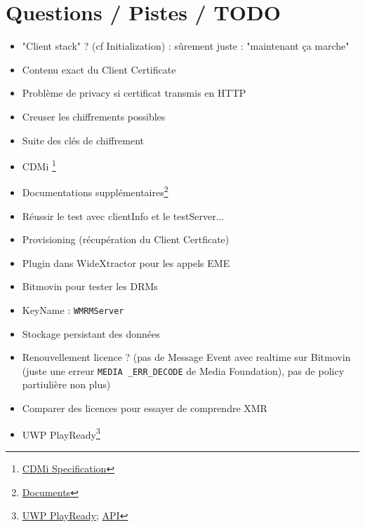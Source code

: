 \documentclass[french]{article}
\begin{document}
\section{Questions / Pistes / TODO}
\begin{itemize}
	\item[\checkmark] "Client stack" ? (cf Initialization) : sûrement juste : "maintenant ça marche"
	\item[\checkmark] Contenu exact du Client Certificate
	\item Problème de privacy si certificat transmis en HTTP
	\item[\checkmark] Creuser les chiffrements possibles
	\item Suite des clés de chiffrement
	\item CDMi \footnote{\href{https://download.microsoft.com/download/E/A/4/EA470677-6C3C-4AFE-8A86-A196ADFD0F78/Content Decryption Module Interface Specification.pdf}{CDMi Specification}}
	
	\item Documentations supplémentaires\footnote{\href{https://www.microsoft.com/playready/documents/}{Documents}}
	
	\item [\checkmark]Réussir le test avec clientInfo et le testServer...
	
	\item Provisioning (récupération du Client Certficate)
	\item[\checkmark] Plugin dans WideXtractor pour les appels EME
	\item[\checkmark] Bitmovin pour tester les DRMs
	
	\item KeyName : \texttt{WMRMServer}
	
	
	\item Stockage persistant des données
	
	\item[\checkmark] Renouvellement licence ? (pas de Message Event avec realtime sur Bitmovin (juste une erreur \texttt{MEDIA \_ERR\_DECODE} de Media Foundation), pas de policy partiulière non plus)
	
	\item Comparer des licences pour essayer de comprendre XMR
	
	\item[\checkmark] UWP PlayReady\footnote{\href{https://learn.microsoft.com/en-us/windows/uwp/audio-video-camera/playready-client-sdk}{UWP PlayReady}; \href{https://learn.microsoft.com/en-us/uwp/api/Windows.Media.Protection.PlayReady?view=winrt-22621}{API}}
	

\end{itemize}
\end{document}
